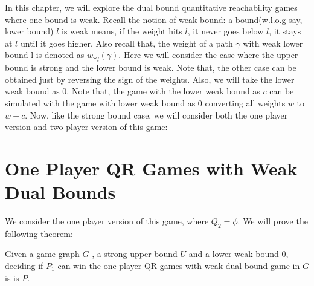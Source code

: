 In this chapter, we will explore the dual bound quantitative reachability games where one bound is weak. Recall the notion of weak bound: a bound(w.l.o.g say, lower bound) $l$ is weak means, if the weight hits $l$, it never goes below $l$, it stays at $l$ until it goes higher. Also recall that, the weight of a path $\gamma$ with weak lower bound l is denoted as $w\mathord{\downarrow}_{l}(\gamma)$. Here we will consider the case where the upper bound is strong and the lower bound is weak. Note that, the other case can be obtained just by reversing the sign of the weights. Also, we will take the lower weak bound as $0$. Note that, the game with the lower weak bound as $c$ can be simulated with the game with lower weak bound as $0$ converting all weights $w$ to $w-c$. Now, like the strong bound case, we will consider both the one player version and two player version of this game:\\

\section{One Player QR Games with Weak Dual Bounds}

We consider the one player version of this game, where $Q_2= \phi$. We will prove the following theorem:\\

\begin{theorem}
\label{one-player-weak-thm}
Given a game graph $G$ , a strong upper bound $U$ and a lower weak bound $0$, deciding if $P_1$ can win the one player QR games with weak dual bound game in $G$ is is $P$.
\end{theorem}

